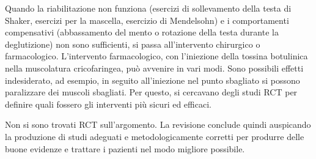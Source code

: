 Quando la riabilitazione non funziona (esercizi di sollevamento della testa di 
Shaker, esercizi per la mascella, esercizio di Mendelsohn) e i comportamenti 
compensativi (abbassamento del mento o rotazione della testa durante la 
deglutizione) non sono sufficienti, si passa all'intervento chirurgico o 
farmacologico.
L'intervento farmacologico, con l'iniezione della tossina botulinica nella 
muscolatura cricofaringea, può avvenire in vari modi.
Sono possibili effetti indesiderato, ad esempio, in seguito all'iniezione nel 
punto sbagliato si possono paralizzare dei muscoli sbagliati.
Per questo, si cercavano degli studi RCT per definire quali fossero gli 
interventi più sicuri ed efficaci.

Non si sono trovati RCT sull'argomento.
La revisione conclude quindi auspicando la produzione di studi adeguati e 
metodologicamente corretti per produrre delle buone evidenze e trattare i 
pazienti nel modo migliore possibile.